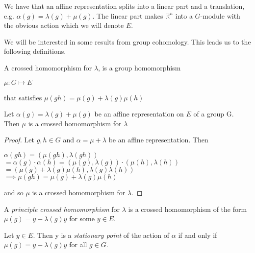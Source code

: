 We have that an affine representation splits into a linear part and a
translation, e.g. $\alpha(g) = \lambda(g) + \mu(g)$. The linear part makes
$\mathbb{R}^n$ into a $G$-module with the obvious action which we will denote
$E$.

We will be interested in some results from group cohomology. This leads us to
the following definitions.

\begin{definition}
    A crossed homomorphism for $\lambda$, is a group homomorphism
    \begin{center}
        $\mu: G \mapsto E$
    \end{center}
    that satisfies $\mu(gh) = \mu(g) + \lambda(g)\mu(h)$
\end{definition}

\begin{prop}
    Let $\alpha(g) = \lambda(g) + \mu(g)$ be an affine representation on $E$ of a group G. Then
    $\mu$ is a crossed homomorphism for $\lambda$
\end{prop}
\begin{proof}
    Let $g,h \in G$ and $\alpha = \mu + \lambda$ be an affine representation. Then
    \begin{center}
        $\alpha(gh) = (\mu(gh), \lambda(gh))$\\
        $=\alpha(g)\cdot \alpha(h)= (\mu(g), \lambda(g)) \cdot(\mu(h), \lambda(h)) $\\
        $= (\mu(g) + \lambda(g)\mu(h), \lambda(g)\lambda(h))$\\
        $\implies \mu(gh) = \mu(g) + \lambda(g)\mu(h)$
    \end{center}
    and so $\mu$ is a crossed homomorphism for $\lambda$.
\end{proof}

\begin{definition}
    A \textit{principle crossed homomorphism} for $\lambda$ is a crossed homomorphism
    of the form $\mu(g) = y- \lambda(g)y$ for some $y \in E$.
\end{definition}

\begin{prop}
    Let $y\in E$. Then y is a \textit{stationary point} of the action of $\alpha$ if
    and only if $\mu(g) = y - \lambda(g)y$ for all $g \in G$.
\end{prop}

